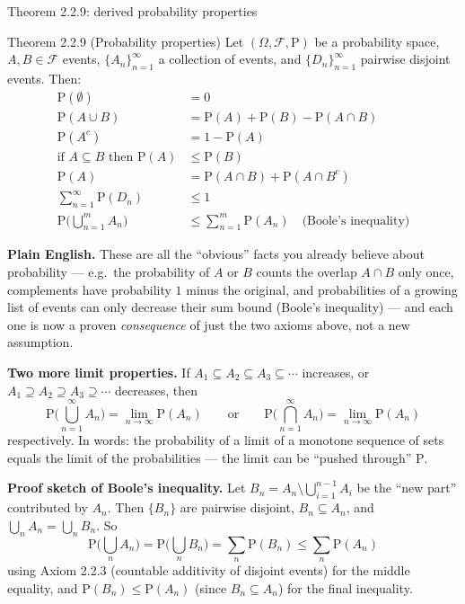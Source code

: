 \documentclass[aspectratio=169,10pt]{beamer}
\begin{document}
\begin{frame}[allowframebreaks]{Theorem 2.2.9: derived probability properties}
\begin{block}{Theorem 2.2.9 (Probability properties)}
Let $(\Omega,\mathcal{F},\mathrm{P})$ be a probability space, $A,B\in\mathcal{F}$
events, $\{A_n\}_{n=1}^{\infty}$ a collection of events, and
$\{D_n\}_{n=1}^{\infty}$ pairwise disjoint events. Then:
\begin{align}
\mathrm{P}(\emptyset) &= 0 \\
\mathrm{P}(A\cup B) &= \mathrm{P}(A)+\mathrm{P}(B)-\mathrm{P}(A\cap B) \\
\mathrm{P}(A^c) &= 1-\mathrm{P}(A) \\
\text{if } A\subseteq B \text{ then } \mathrm{P}(A)&\leq\mathrm{P}(B) \\
\mathrm{P}(A) &= \mathrm{P}(A\cap B)+\mathrm{P}(A\cap B^c) \\
\textstyle\sum_{n=1}^{\infty}\mathrm{P}(D_n) &\leq 1 \\
\mathrm{P}\big(\textstyle\bigcup_{n=1}^{m}A_n\big) &\leq \textstyle\sum_{n=1}^{m}\mathrm{P}(A_n) \quad\text{(Boole's inequality)}
\end{align}
\end{block}
\textbf{Plain English.} These are all the ``obvious'' facts you already
believe about probability --- e.g.\ the probability of $A$ or $B$ counts the
overlap $A\cap B$ only once, complements have probability $1$ minus the
original, and probabilities of a growing list of events can only decrease
their sum bound (Boole's inequality) --- and each one is now a proven
\emph{consequence} of just the two axioms above, not a new assumption.

\framebreak

\textbf{Two more limit properties.} If $A_1\subseteq A_2\subseteq A_3\subseteq\cdots$
increases, or $A_1\supseteq A_2\supseteq A_3\supseteq\cdots$ decreases, then
\[ \mathrm{P}\Big(\bigcup_{n=1}^{\infty}A_n\Big) = \lim_{n\to\infty}\mathrm{P}(A_n)
\qquad\text{or}\qquad
\mathrm{P}\Big(\bigcap_{n=1}^{\infty}A_n\Big) = \lim_{n\to\infty}\mathrm{P}(A_n) \]
respectively. In words: the probability of a limit of a monotone sequence of
sets equals the limit of the probabilities --- the limit can be ``pushed
through'' $\mathrm{P}$.

\textbf{Proof sketch of Boole's inequality.} Let $B_n = A_n\setminus\bigcup_{i=1}^{n-1}A_i$
be the ``new part'' contributed by $A_n$. Then $\{B_n\}$ are pairwise disjoint,
$B_n\subseteq A_n$, and $\bigcup_n A_n=\bigcup_n B_n$. So
\[ \mathrm{P}\Big(\bigcup_n A_n\Big) = \mathrm{P}\Big(\bigcup_n B_n\Big) = \sum_n \mathrm{P}(B_n) \leq \sum_n \mathrm{P}(A_n) \]
using Axiom 2.2.3 (countable additivity of disjoint events) for the middle
equality, and $\mathrm{P}(B_n)\leq \mathrm{P}(A_n)$ (since $B_n\subseteq A_n$)
for the final inequality.
\end{frame}
\end{document}
